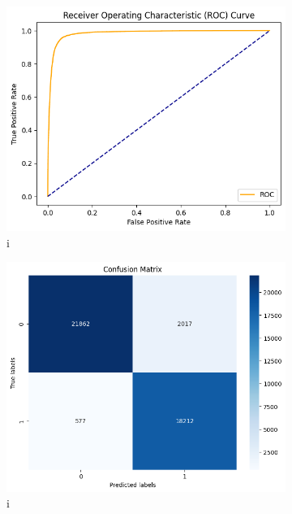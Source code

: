 \documentclass{josis}
\begin{document}
\begin{figure}[!h]%
\centering


\begin{subfigure}{.24\textwidth}
    \centering
    \includegraphics[width=0.95\linewidth]{ROC5.png}  
    \caption{i}
    \label{SUBFIGURE LABEL 1}
\end{subfigure}
\begin{subfigure}{.24\textwidth}
    \centering
    \includegraphics[width=0.95\linewidth]{CM5.png}  
    \caption{i}
    \label{SUBFIGURE LABEL 2}
\end{subfigure}
\begin{subfigure}{.24\textwidth}
    \centering

\end{subfigure}
\end{figure}
\end{document}

